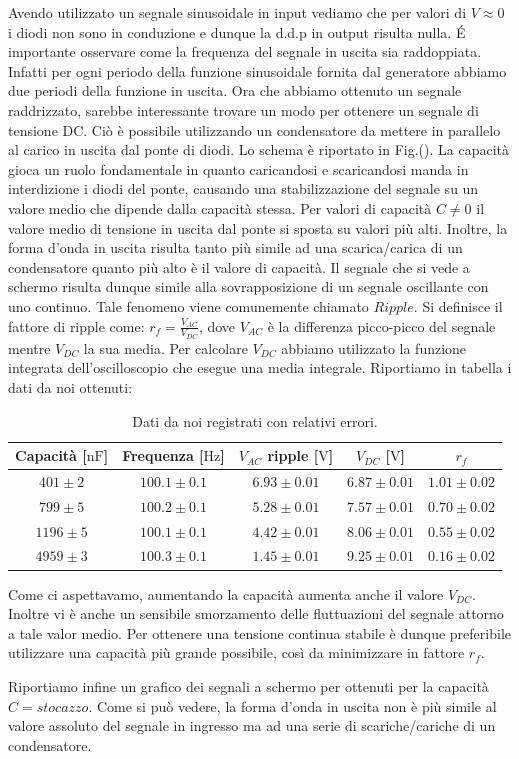 Avendo utilizzato un segnale sinusoidale in input vediamo che per valori di $V \approx 0$ i diodi non sono in conduzione e dunque la d.d.p in output risulta nulla. \'E importante osservare come la frequenza del segnale in uscita sia raddoppiata. Infatti per ogni periodo della funzione sinusoidale fornita dal generatore abbiamo due periodi della funzione in uscita. Ora che abbiamo ottenuto un segnale raddrizzato, sarebbe interessante trovare un modo per ottenere un segnale di tensione DC. Ciò è possibile utilizzando un condensatore da mettere in parallelo al carico in uscita dal ponte di diodi. Lo schema è riportato in Fig.(). La capacità gioca un ruolo fondamentale in quanto caricandosi e scaricandosi manda in interdizione i diodi del ponte, causando una stabilizzazione del segnale su un valore medio che dipende dalla capacità stessa. Per valori di capacità $C\neq 0$ il valore medio di tensione in uscita dal ponte si sposta su valori più alti. Inoltre, la forma d'onda in uscita risulta tanto più simile ad una scarica/carica di un condensatore quanto più alto è il valore di capacità. Il segnale che si vede a schermo risulta dunque simile alla sovrapposizione di un segnale oscillante con uno continuo. Tale fenomeno viene comunemente chiamato $Ripple$. Si definisce il fattore di ripple come: $r_f= \frac{V_{AC}}{V_{DC}}$, dove $V_{AC}$ è la differenza picco-picco del segnale mentre $V_{DC}$ la sua media. Per calcolare $V_{DC}$ abbiamo utilizzato la funzione integrata dell'oscilloscopio che esegue una media integrale. Riportiamo in tabella i dati da noi ottenuti:

\begin{table}
\centering
\caption{Dati da noi registrati con relativi errori.}
{\renewcommand{\arraystretch}{1.6}%
\begin{tabular}{c|c|c|c|c}
Capacità [$\si{\nano\farad}$] & Frequenza [$\si{\hertz}$] & $V_{AC}$ ripple [$\si{\volt}$] & $V_{DC}$ [$\si{\volt}$] & $r_f$ \\      \hline
$401 \pm 2$ &$100.1 \pm 0.1 $& $6.93 \pm 0.01$ & $6.87 \pm 0.01$ & $1.01 \pm 0.02$\\
$799 \pm 5$ &$100.2 \pm 0.1$& $5.28 \pm 0.01$ & $7.57 \pm 0.01$ & $0.70 \pm 0.02$\\
$1196 \pm 5$ &$100.1 \pm 0.1$& $4.42 \pm 0.01$ & $8.06 \pm 0.01$ & $0.55 \pm 0.02$\\
$4959 \pm 3$ &$100.3 \pm 0.1$& $1.45 \pm 0.01$ & $9.25 \pm 0.01$& $0.16 \pm 0.02$\\
\end{tabular}}
\end{table}

Come ci aspettavamo, aumentando la capacità aumenta anche il valore $V_{DC}$. Inoltre vi è anche un sensibile smorzamento delle fluttuazioni del segnale attorno a tale valor medio. Per ottenere una tensione continua stabile è dunque preferibile utilizzare una capacità più grande possibile, così da minimizzare in fattore $r_f$.

Riportiamo infine un grafico dei segnali a schermo per ottenuti per la capacità $C=stocazzo$. Come si può vedere, la forma d'onda in uscita non è più simile al valore assoluto del segnale in ingresso ma ad una serie di scariche/cariche di un condensatore.



 